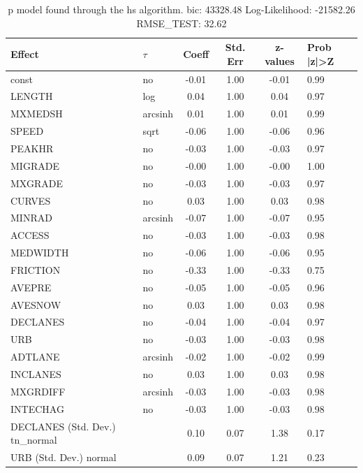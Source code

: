 \begin{table}
	\caption{p model found through the hs algorithm. bic: 43328.48 Log-Likelihood: -21582.26 RMSE_TEST: 32.62}
	\begin{center}
		\begin{tabular}{|l|l|c|c|c|l|}
			\hline
			Effect & $\tau$ & Coeff & Std. Err & z-values & Prob |z|>Z \\
			\hline
			const & no & -0.01 & 1.00 & -0.01 & 0.99 \\
			\hline
			LENGTH & log & 0.04 & 1.00 & 0.04 & 0.97 \\
			\hline
			MXMEDSH & arcsinh & 0.01 & 1.00 & 0.01 & 0.99 \\
			\hline
			SPEED & sqrt & -0.06 & 1.00 & -0.06 & 0.96 \\
			\hline
			PEAKHR & no & -0.03 & 1.00 & -0.03 & 0.97 \\
			\hline
			MIGRADE & no & -0.00 & 1.00 & -0.00 & 1.00 \\
			\hline
			MXGRADE & no & -0.03 & 1.00 & -0.03 & 0.97 \\
			\hline
			CURVES & no & 0.03 & 1.00 & 0.03 & 0.98 \\
			\hline
			MINRAD & arcsinh & -0.07 & 1.00 & -0.07 & 0.95 \\
			\hline
			ACCESS & no & -0.03 & 1.00 & -0.03 & 0.98 \\
			\hline
			MEDWIDTH & no & -0.06 & 1.00 & -0.06 & 0.95 \\
			\hline
			FRICTION & no & -0.33 & 1.00 & -0.33 & 0.75 \\
			\hline
			AVEPRE & no & -0.05 & 1.00 & -0.05 & 0.96 \\
			\hline
			AVESNOW & no & 0.03 & 1.00 & 0.03 & 0.98 \\
			\hline
			DECLANES & no & -0.04 & 1.00 & -0.04 & 0.97 \\
			\hline
			URB & no & -0.03 & 1.00 & -0.03 & 0.98 \\
			\hline
			ADTLANE & arcsinh & -0.02 & 1.00 & -0.02 & 0.99 \\
			\hline
			INCLANES & no & 0.03 & 1.00 & 0.03 & 0.98 \\
			\hline
			MXGRDIFF & arcsinh & -0.03 & 1.00 & -0.03 & 0.98 \\
			\hline
			INTECHAG & no & -0.03 & 1.00 & -0.03 & 0.98 \\
			\hline
			DECLANES (Std. Dev.) tn_normal &  & 0.10 & 0.07 & 1.38 & 0.17 \\
			\hline
			URB (Std. Dev.) normal &  & 0.09 & 0.07 & 1.21 & 0.23 \\

\end{tabular}
\end{center}
\end{table}
